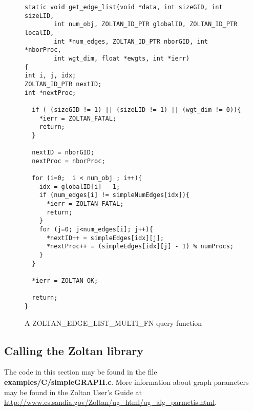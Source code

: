 \begin{figure}
\begin{flushleft}
\begin{verbatim}
static void get_edge_list(void *data, int sizeGID, int sizeLID,
        int num_obj, ZOLTAN_ID_PTR globalID, ZOLTAN_ID_PTR localID,
        int *num_edges, ZOLTAN_ID_PTR nborGID, int *nborProc,
        int wgt_dim, float *ewgts, int *ierr)
{
int i, j, idx;
ZOLTAN_ID_PTR nextID;
int *nextProc;

  if ( (sizeGID != 1) || (sizeLID != 1) || (wgt_dim != 0)){
    *ierr = ZOLTAN_FATAL;
    return;
  }

  nextID = nborGID;
  nextProc = nborProc;

  for (i=0;  i < num_obj ; i++){
    idx = globalID[i] - 1;
    if (num_edges[i] != simpleNumEdges[idx]){
      *ierr = ZOLTAN_FATAL;
      return;
    }
    for (j=0; j<num_edges[i]; j++){
      *nextID++ = simpleEdges[idx][j];
      *nextProc++ = (simpleEdges[idx][j] - 1) % numProcs;
    }
  }

  *ierr = ZOLTAN_OK;

  return;
}
\end{verbatim}
\end{flushleft}
\caption{A ZOLTAN\_EDGE\_LIST\_MULTI\_FN query function}
\label{fig:EdgeListMulti}
\end{figure}

\clearpage

\subsection{Calling the Zoltan library}

The code in this section may be found in the 
file \textbf{examples/C/simpleGRAPH.c}.
More information about graph parameters 
may be found in the Zoltan User's Guide at
\url{http://www.cs.sandia.gov/Zoltan/ug_html/ug_alg_parmetis.html}.

